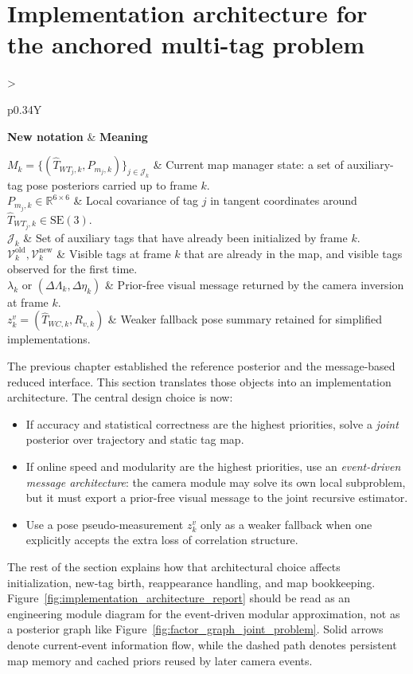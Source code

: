 \documentclass[11pt]{report}
\newcommand{\SE}{\mathrm{SE}(3)}
\newcommand{\R}{\mathbb{R}}
\newcommand{\NotationTable}[1]{%
\vspace{0.6mm}
{\scriptsize
\setlength{\tabcolsep}{2.5pt}
\begin{tabularx}{\columnwidth}{>{\raggedright\arraybackslash}p{0.34\columnwidth}Y}
\toprule
\textbf{New notation} & \textbf{Meaning}\\
\midrule
#1\\
\bottomrule
\end{tabularx}}
\vspace{0.8mm}}
\begin{document}
\section{Implementation architecture for the anchored multi-tag problem}
\NotationTable{
$M_k=\{(\widehat T_{WT_j,k},P_{m_j,k})\}_{j\in\mathcal J_k}$ & Current map manager state: a set of auxiliary-tag pose posteriors carried up to frame $k$.\\
$P_{m_j,k}\in\R^{6\times 6}$ & Local covariance of tag $j$ in tangent coordinates around $\widehat T_{WT_j,k}\in\SE$.\\
$\mathcal J_k$ & Set of auxiliary tags that have already been initialized by frame $k$.\\
$\mathcal V_k^{\mathrm{old}},\mathcal V_k^{\mathrm{new}}$ & Visible tags at frame $k$ that are already in the map, and visible tags observed for the first time.\\
$\lambda_k$ or $(\Delta\Lambda_k,\Delta\eta_k)$ & Prior-free visual message returned by the camera inversion at frame $k$.\\
$z_k^v=(\widehat T_{WC,k},R_{v,k})$ & Weaker fallback pose summary retained for simplified implementations.}

The previous chapter established the reference posterior and the message-based reduced interface. This section translates those objects into an implementation architecture. The central design choice is now:
\begin{itemize}
    \item If accuracy and statistical correctness are the highest priorities, solve a \emph{joint} posterior over trajectory and static tag map.
    \item If online speed and modularity are the highest priorities, use an \emph{event-driven message architecture}: the camera module may solve its own local subproblem, but it must export a prior-free visual message to the joint recursive estimator.
    \item Use a pose pseudo-measurement $z_k^v$ only as a weaker fallback when one explicitly accepts the extra loss of correlation structure.
\end{itemize}
The rest of the section explains how that architectural choice affects initialization, new-tag birth, reappearance handling, and map bookkeeping. Figure~\ref{fig:implementation_architecture_report} should be read as an engineering module diagram for the event-driven modular approximation, not as a posterior graph like Figure~\ref{fig:factor_graph_joint_problem}. Solid arrows denote current-event information flow, while the dashed path denotes persistent map memory and cached priors reused by later camera events.
\end{document}
